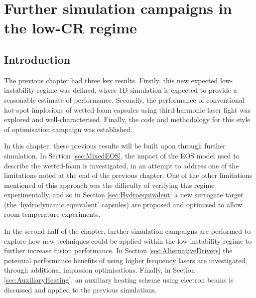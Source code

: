 

\chapter{\label{ch-FurtherSims} Further simulation campaigns in the low-CR regime}

\minitoc

\section{Introduction}
The previous chapter had three key results. Firstly, this new expected low-instability regime was defined, where 1D simulation is expected to provide a reasonable estimate of performance. Secondly, the performance of conventional hot-spot implosions of wetted-foam capsules using third-harmonic laser light was explored and well-characterised. Finally, the code and methodology for this style of optimisation campaign was established.

In this chapter, these previous results will be built upon through further simulation.  In Section \ref{sec:MixedEOS}, the impact of the EOS model used to describe the wetted-foam is investigated, in an attempt to address one of the limitations noted at the end of the previous chapter. One of the other limitations mentioned of this approach was the difficulty of verifying this regime experimentally, and so in Section \ref{sec:Hydroequivalent} a new surrogate target (the `hydrodynamic equivalent' capsules) are proposed and optimised to allow room temperature experiments.

In the second half of the chapter, further simulation campaigns are performed to explore how new techniques could be applied within the low-instability regime to further increase fusion performance. In Section \ref{sec:AlternativeDrivers} the potential performance benefits of using higher frequency lasers are investigated, through additional implosion optimisations. Finally, in Section \ref{sec:AuxiliaryHeating}, an auxiliary heating scheme using electron beams is discussed and applied to the previous simulations.

